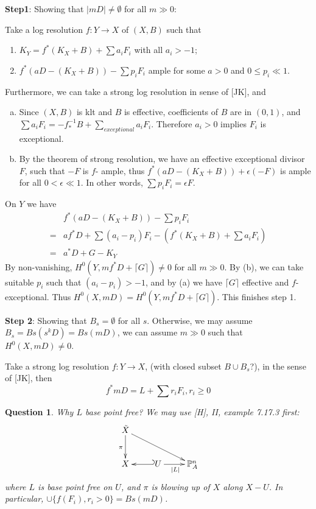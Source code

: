 \documentclass{article}
\newtheorem*{ques}{Question}
\begin{document}
\textbf{Step1}: Showing that $ |mD|\neq \emptyset $ for all $ m\gg 0 $:

Take a log resolution $ f:Y\to X $ of $ (X,B) $ such that
\begin{enumerate}
  \item $ K_Y=f^*(K_X+B)+\sum a_iF_i $ with all $ a_i>-1 $;
  \item $ f^*(aD-(K_X+B))-\sum p_iF_i $ ample for some $ a>0 $ and $ 0\leqslant p_i\ll 1 $.
\end{enumerate}

Furthermore, we can take a strong log resolution in sense of [JK], and 
\begin{enumerate}[(a)]
  \item Since $ (X,B) $ is klt and $ B $ is effective, coefficients of $ B $ are in $ (0,1) $, and $ \sum a_iF_i=-f^{-1}_*B+\sum_{exceptional}a_iF_i $. Therefore $ a_i>0 $ implies $ F_i $ is exceptional.
  \item By the theorem of strong resolution, we have an effective exceptional divisor $ F $, such that $ -F $ is $ f $- ample, thus $ f^*(aD-(K_X+B))+\epsilon(-F) $ is ample for all $ 0<\epsilon\ll 1 $. In other words, $ \sum p_iF_i=\epsilon F $.
\end{enumerate}

On $ Y $ we have
\begin{equation*}
  \begin{aligned}
  &f^*(aD-(K_X+B))-\sum p_iF_i\\
  =&af^*D+\sum(a_i-p_i)F_i-(f^*(K_X+B)+\sum a_iF_i)\\
  =&a^*D+G-K_Y
  \end{aligned}
\end{equation*}
By non-vanishing, $ H^0(Y,mf^*D+\lceil G\rceil )\neq 0 $ for all $ m\gg 0 $. By (b), we can take suitable $ p_i $ such that $ (a_i-p_i)>-1 $, and by (a) we have $ \lceil G\rceil  $ effective and $ f $-exceptional. Thus  $ H^0(X,mD)= H^0(Y,mf^*D+\lceil G\rceil ) $. This  finishes step 1.

\textbf{Step 2}: Showing that $ B_s=\emptyset $ for all $ s $. Otherwise, we may assume $ B_s=Bs(s^kD)=Bs(mD) $, we can assume $ m\gg 0 $ such that $ H^0(X,mD)\neq 0 $. 

Take a strong log resolution $ f:Y\to X $, (with closed subset $ B\cup B_s $?), in the sense of [JK], then 
\[ f^*mD=L+\sum r_iF_i , r_i\geqslant 0\]


\begin{ques}
  Why $ L $ base point free? We may use [H], II, example 7.17.3 first:
  \[ \xymatrix{
  \tilde{X}\ar[rrd]\ar[d]_{\pi}\\
  X&U\ar@{_(->}[l]\ar[r]_{|L|}&\mathbb{P}^n_A 
  } \]
where $ L $ is base point free on $ U $, and $ \pi $ is blowing up of $ X $ along $ X-U $. In particular, $ \cup \{ f(F_i), r_i>0\}=Bs(mD) $.
\end{ques}
\end{document}
